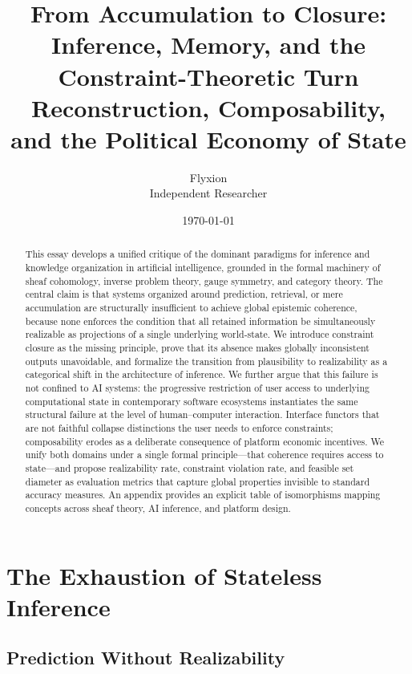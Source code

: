 \documentclass[12pt, oneside]{article}
\title{\textbf{From Accumulation to Closure: Inference, Memory, and the Constraint-Theoretic Turn} \\[0.5em]
\large Reconstruction, Composability, and the Political Economy of State}
\author{Flyxion \\[0.3em]
\normalsize Independent Researcher}
\date{\today}
\begin{document}
\maketitle

\begin{abstract}
This essay develops a unified critique of the dominant paradigms for inference and knowledge organization in artificial intelligence, grounded in the formal machinery of sheaf cohomology, inverse problem theory, gauge symmetry, and category theory. The central claim is that systems organized around prediction, retrieval, or mere accumulation are structurally insufficient to achieve global epistemic coherence, because none enforces the condition that all retained information be simultaneously realizable as projections of a single underlying world-state. We introduce constraint closure as the missing principle, prove that its absence makes globally inconsistent outputs unavoidable, and formalize the transition from plausibility to realizability as a categorical shift in the architecture of inference. We further argue that this failure is not confined to AI systems: the progressive restriction of user access to underlying computational state in contemporary software ecosystems instantiates the same structural failure at the level of human--computer interaction. Interface functors that are not faithful collapse distinctions the user needs to enforce constraints; composability erodes as a deliberate consequence of platform economic incentives. We unify both domains under a single formal principle---that coherence requires access to state---and propose realizability rate, constraint violation rate, and feasible set diameter as evaluation metrics that capture global properties invisible to standard accuracy measures. An appendix provides an explicit table of isomorphisms mapping concepts across sheaf theory, AI inference, and platform design.
\end{abstract}

\newpage
\tableofcontents
\newpage

\section{The Exhaustion of Stateless Inference}

\subsection{Prediction Without Realizability}
\end{document}
